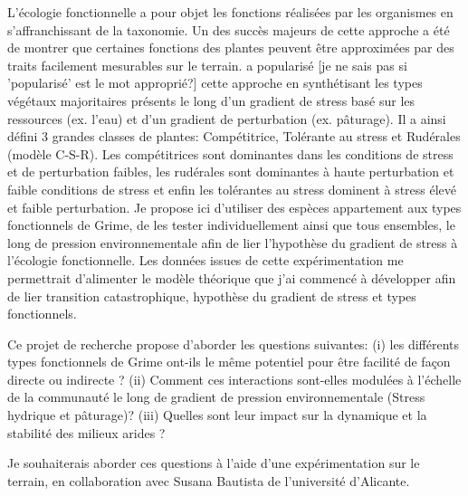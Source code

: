 \documentclass[12pt]{article} %
\begin{document}
L'écologie fonctionnelle a pour objet les fonctions réalisées par les organismes en s'affranchissant de la taxonomie. Un des succès majeurs de cette approche a été de montrer que certaines fonctions des plantes peuvent être approximées par des traits facilement mesurables sur le terrain. \citet{Grime1977a} a popularisé [je ne sais pas si 'popularisé' est le mot approprié?] cette approche en synthétisant les types végétaux majoritaires présents le long d'un gradient de stress basé sur les ressources (ex. l'eau) et d'un gradient de perturbation (ex. pâturage). Il a ainsi défini 3 grandes classes de plantes: Compétitrice, Tolérante au stress et Rudérales (modèle C-S-R). Les compétitrices sont dominantes dans les conditions de stress et de perturbation faibles, les rudérales sont dominantes à haute perturbation et faible conditions de stress et enfin les tolérantes au stress dominent à stress élevé et faible perturbation. Je propose ici d'utiliser des espèces appartement aux types fonctionnels de Grime, de les tester individuellement ainsi que tous ensembles, le long de pression environnementale afin de lier l'hypothèse du gradient de stress à l'écologie fonctionnelle. Les données issues de cette expérimentation me permettrait d'alimenter le modèle théorique que j'ai commencé à développer afin de lier transition catastrophique, hypothèse du gradient de stress et types fonctionnels.


Ce projet de recherche propose d'aborder les questions suivantes: (i) les différents types fonctionnels de Grime ont-ils le même potentiel pour être facilité de façon directe ou indirecte ?
(ii) Comment ces interactions sont-elles modulées à l'échelle de la communauté le long de gradient de pression environnementale (Stress hydrique et pâturage)? (iii) Quelles sont leur impact sur la dynamique et la stabilité des milieux arides ?

Je souhaiterais aborder ces questions à l'aide d'une expérimentation sur le terrain, en collaboration avec Susana Bautista de l'université d'Alicante. %

\end{document}
